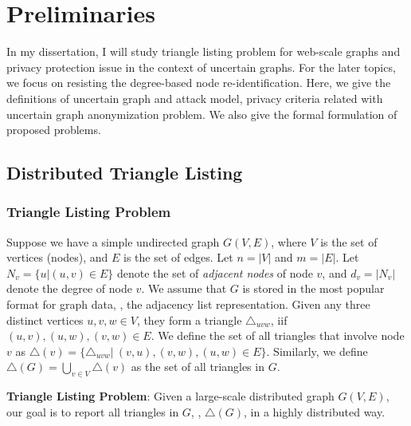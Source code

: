 \chapter {Preliminaries}
\label{chp:pre}

In my dissertation, I will study triangle listing problem for web-scale graphs  and privacy protection issue in the context of uncertain graphs. For the later topics, we focus on  resisting the degree-based node re-identification. Here, we give the definitions of uncertain graph and attack model, privacy criteria related with uncertain graph anonymization problem. We also give the formal formulation of proposed problems. 


\section{Distributed Triangle Listing}
\subsection{Triangle Listing Problem}
Suppose we have a simple undirected graph $G(V,E)$, where $V$ is the set of vertices (nodes), and $E$ is the set of edges. Let $n=|V|$ and $m=|E|$. Let $N_v = \{u | (u,v) \in E \}$ denote the set of \emph{adjacent nodes} of node $v$, and $d_v=|N_v|$ denote the degree of node $v$. We assume that  $G$ is stored in the most popular format for graph data, {\ie}, the adjacency list representation. Given any three distinct vertices $u, v, w \in V$, they form a triangle $\triangle_{uvw}$, iif $(u,v), (u,w), (v,w) \in E$. We define the set of all triangles that involve node $v$ as $\triangle(v)=\{ \triangle_{uvw} | \  (v,u), (v,w), (u,w) \in E \}$. Similarly, we define $\triangle(G)= \bigcup_{v \in V} {\triangle (v)}$ as the set of all triangles in $G$.

\begin{problem}
    \textbf{Triangle Listing Problem}: Given a  large-scale distributed graph $G(V,E)$, our goal is to report all triangles in $G$, {\ie}, $\triangle(G)$, in a highly distributed way. 
    \label{prob:TLMap}
\end{problem}

